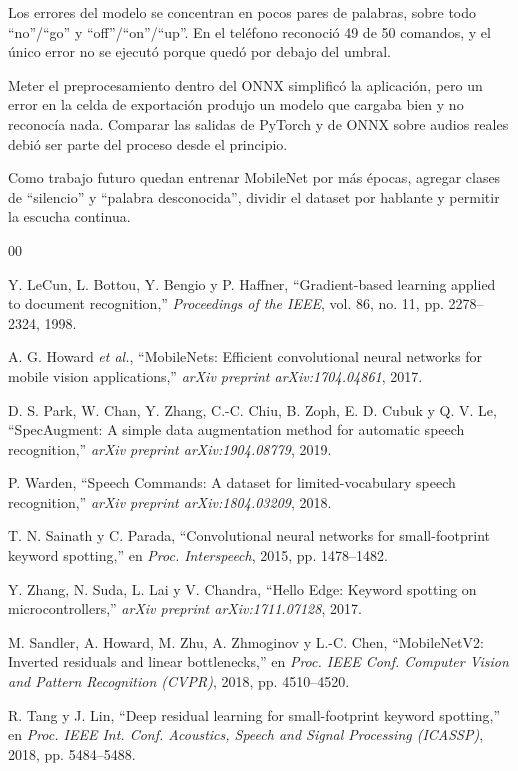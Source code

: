 \documentclass[conference]{IEEEtran}
\begin{document}
Los errores del modelo se concentran en pocos pares de palabras, sobre todo ``no''/``go'' y ``off''/``on''/``up''. En el teléfono reconoció 49 de 50 comandos, y el único error no se ejecutó porque quedó por debajo del umbral.

Meter el preprocesamiento dentro del ONNX simplificó la aplicación, pero un error en la celda de exportación produjo un modelo que cargaba bien y no reconocía nada. Comparar las salidas de PyTorch y de ONNX sobre audios reales debió ser parte del proceso desde el principio.

Como trabajo futuro quedan entrenar MobileNet por más épocas, agregar clases de ``silencio'' y ``palabra desconocida'', dividir el dataset por hablante y permitir la escucha continua.

\begin{thebibliography}{00}

 Y. LeCun, L. Bottou, Y. Bengio y P. Haffner, ``Gradient-based learning applied to document recognition,'' \textit{Proceedings of the IEEE}, vol. 86, no. 11, pp. 2278--2324, 1998.

 A. G. Howard \textit{et al.}, ``MobileNets: Efficient convolutional neural networks for mobile vision applications,'' \textit{arXiv preprint arXiv:1704.04861}, 2017.

 D. S. Park, W. Chan, Y. Zhang, C.-C. Chiu, B. Zoph, E. D. Cubuk y Q. V. Le, ``SpecAugment: A simple data augmentation method for automatic speech recognition,'' \textit{arXiv preprint arXiv:1904.08779}, 2019.

 P. Warden, ``Speech Commands: A dataset for limited-vocabulary speech recognition,'' \textit{arXiv preprint arXiv:1804.03209}, 2018.

 T. N. Sainath y C. Parada, ``Convolutional neural networks for small-footprint keyword spotting,'' en \textit{Proc. Interspeech}, 2015, pp. 1478--1482.

 Y. Zhang, N. Suda, L. Lai y V. Chandra, ``Hello Edge: Keyword spotting on microcontrollers,'' \textit{arXiv preprint arXiv:1711.07128}, 2017.

 M. Sandler, A. Howard, M. Zhu, A. Zhmoginov y L.-C. Chen, ``MobileNetV2: Inverted residuals and linear bottlenecks,'' en \textit{Proc. IEEE Conf. Computer Vision and Pattern Recognition (CVPR)}, 2018, pp. 4510--4520.

 R. Tang y J. Lin, ``Deep residual learning for small-footprint keyword spotting,'' en \textit{Proc. IEEE Int. Conf. Acoustics, Speech and Signal Processing (ICASSP)}, 2018, pp. 5484--5488.


\end{thebibliography}
\end{document}
